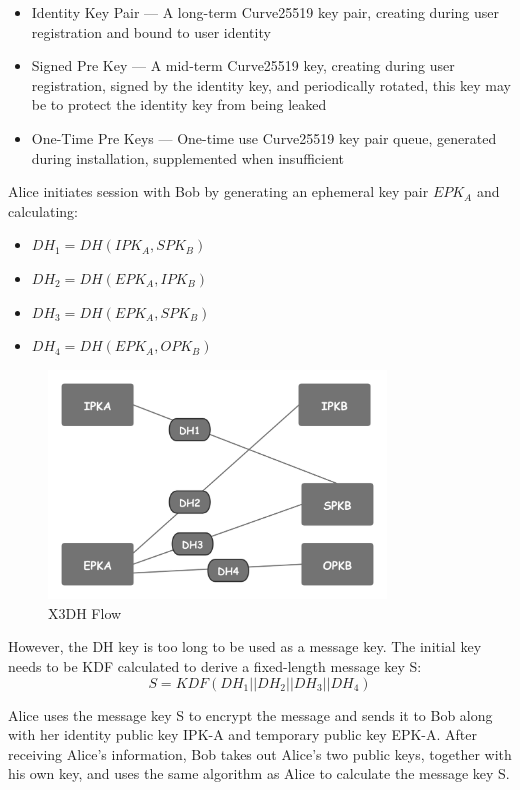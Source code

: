 \documentclass[11pt]{article}
\begin{document}
\begin{itemize}
    \item Identity Key Pair --- A long-term Curve25519 key pair, creating during user registration and bound to user identity 
    \item Signed Pre Key --- A mid-term Curve25519 key, creating during user registration, signed by the identity key, and periodically rotated, this key may be to protect the identity key from being leaked
    \item One-Time Pre Keys --- One-time use Curve25519 key pair queue, generated during installation, supplemented when insufficient
\end{itemize}

Alice initiates session with Bob by generating an ephemeral key pair $EPK_A$ and calculating:
\begin{itemize}
    \item $DH_1 = DH(IPK_A, SPK_B)$
    \item $DH_2 = DH(EPK_A, IPK_B)$
    \item $DH_3 = DH(EPK_A, SPK_B)$
    \item $DH_4 = DH(EPK_A, OPK_B)$
\end{itemize}

\begin{figure}[H]
    \centering
    \includegraphics[width=0.8\textwidth]{Fig2}
    \caption{X3DH Flow}
\end{figure}

However, the DH key is too long to be used as a message key. The initial key needs to be KDF calculated to derive a fixed-length message key S:
\begin{equation}
    S = KDF(DH_1||DH_2||DH_3||DH_4)
\end{equation}

Alice uses the message key S to encrypt the message and sends it to Bob along with her identity public key IPK-A and temporary public key EPK-A. 
After receiving Alice's information, Bob takes out Alice's two public keys, together with his own key, and uses the same algorithm as Alice to calculate the message key S.
\end{document}

